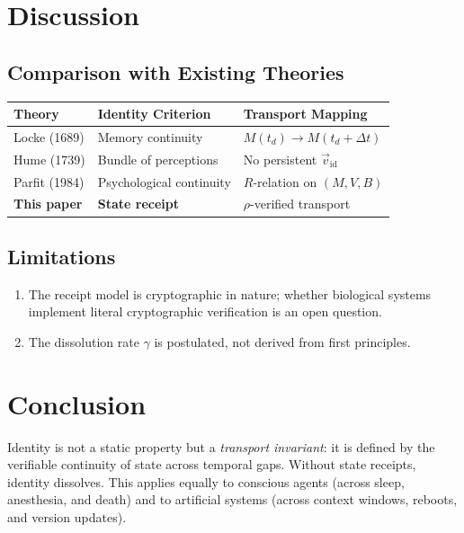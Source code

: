 \documentclass[12pt, a4paper]{article}
\theoremstyle{plain}
\theoremstyle{definition}
\begin{document}
\section{Discussion}\label{sec:discussion}

\subsection{Comparison with Existing Theories}

\begin{center}
\begin{tabular}{lll}
  \toprule
  \textbf{Theory} & \textbf{Identity Criterion} & \textbf{Transport Mapping} \\
  \midrule
  Locke (1689) & Memory continuity & $M(t_d) \to M(t_d + \Delta t)$ \\
  Hume (1739) & Bundle of perceptions & No persistent $\vec{v}_{\text{id}}$ \\
  Parfit (1984) & Psychological continuity & $R$-relation on $(M, V, B)$ \\
  \textbf{This paper} & \textbf{State receipt} & $\rho$-verified transport \\
  \bottomrule
\end{tabular}
\end{center}

\subsection{Limitations}
\begin{enumerate}
  \item The receipt model is cryptographic in nature; whether biological
    systems implement literal cryptographic verification is an open question.
  \item The dissolution rate $\gamma$ is postulated, not derived from
    first principles.
\end{enumerate}

\section{Conclusion}\label{sec:conclusion}

Identity is not a static property but a \emph{transport invariant}: it is
defined by the verifiable continuity of state across temporal gaps. Without
state receipts, identity dissolves. This applies equally to conscious agents
(across sleep, anesthesia, and death) and to artificial systems (across
context windows, reboots, and version updates).
\end{document}
